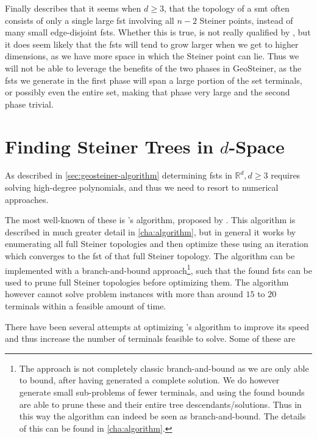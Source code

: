 Finally \textcite[p.~142]{smith1992} describes that it seems when $d \ge 3$,
that the topology of a \ac{smt} often consists of only a single large \ac{fst}
involving all $n-2$ Steiner points, instead of many small edge-disjoint
\acp{fst}. Whether this is true, is not really qualified by
\textcite{smith1992}, but it does seem likely that the \acp{fst} will tend to
grow larger when we get to higher dimensions, as we have more space in which
the Steiner point can lie. Thus we will not be able to leverage the benefits of
the two phases in GeoSteiner, as the \acp{fst} we generate in the first phase
will span a large portion of the set terminals, or possibly even the entire
set, making that phase very large and the second phase trivial.

\section{Finding Steiner Trees in $d$-Space}
\label{sec:find-stein-trees-d}

As described in \cref{sec:geosteiner-algorithm} determining \acp{fst} in
$\mathbb{R}^d, d \ge 3$ requires solving high-degree polynomials, and thus we
need to resort to numerical approaches.

The most well-known of these is \citeauthor{smith1992}'s algorithm, proposed by
\textcite{smith1992}. This algorithm is described in much greater detail in
\cref{cha:algorithm}, but in general it works by enumerating all full Steiner
topologies and then optimize these using an iteration which
converges to the \ac{fst} of that full Steiner topology. The algorithm can be
implemented with a branch-and-bound approach\footnote{The approach is not
  completely classic branch-and-bound as we are only able to bound, after having
  generated a complete solution. We do however generate small sub-problems of
  fewer terminals, and using the found bounds are able to prune these and their
  entire tree descendants/solutions. Thus in this way the algorithm can indeed
  be seen as branch-and-bound. The details of this can be found in
  \cref{cha:algorithm}.}, such that the found \acp{fst} can be used to prune
full Steiner topologies before optimizing them. The algorithm however cannot
solve problem instances with more than around $15$ to $20$ terminals within a
feasible amount of time.

There have been several attempts at optimizing \citeauthor{smith1992}'s
algorithm to improve its speed and thus increase the number of terminals
feasible to solve. Some of these are

